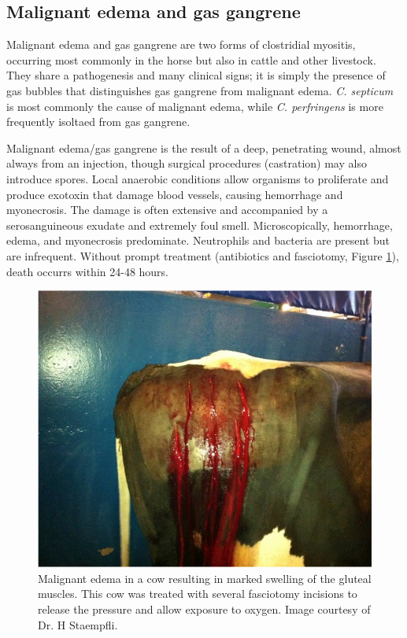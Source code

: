 \documentclass[openany]{book}
\begin{document}
\subsection{Malignant edema and gas
gangrene}\label{malignant-edema-and-gas-gangrene}

Malignant edema and gas gangrene are two forms of clostridial myositis,
occurring most commonly in the horse but also in cattle and other
livestock. They share a pathogenesis and many clinical signs; it is
simply the presence of gas bubbles that distinguishes gas gangrene from
malignant edema. \emph{C. septicum} is most commonly the cause of
malignant edema, while \emph{C. perfringens} is more frequently isoltaed
from gas gangrene.

Malignant edema/gas gangrene is the result of a deep, penetrating wound,
almost always from an injection, though surgical procedures (castration)
may also introduce spores. Local anaerobic conditions allow organisms to
proliferate and produce exotoxin that damage blood vessels, causing
hemorrhage and myonecrosis. The damage is often extensive and
accompanied by a serosanguineous exudate and extremely foul smell.
Microscopically, hemorrhage, edema, and myonecrosis predominate.
Neutrophils and bacteria are present but are infrequent. Without prompt
treatment (antibiotics and fasciotomy, Figure \ref{fig:fasciotomy}),
death occurrs within 24-48 hours.

\begin{figure}

{\centering \includegraphics[width=0.6\linewidth]{images/fasciotomy} 

}

\caption{Malignant edema in a cow resulting in marked swelling of the gluteal muscles. This cow was treated with several fasciotomy incisions to release the pressure and allow exposure to oxygen. Image courtesy of Dr. H Staempfli.}\label{fig:fasciotomy}
\end{figure}
\end{document}
